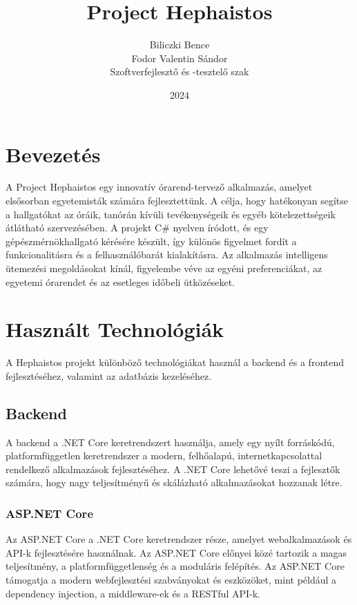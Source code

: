 \documentclass[colorlinks]{thesis-kando}
\theoremstyle{definition}
\theoremstyle{remark}
\begin{document}
\title{Project Hephaistos}
\author{Biliczki Bence\\Fodor Valentin Sándor\\Szoftverfejlesztő és -tesztelő szak}
\date{2024}
\maketitle

\tableofcontents

\pagebreak

\section*{Bevezetés}
A Project Hephaistos egy innovatív órarend-tervező alkalmazás, amelyet elsősorban egyetemisták számára fejlesztettünk. A célja, hogy hatékonyan segítse a hallgatókat az óráik, tanórán kívüli tevékenységeik és egyéb kötelezettségeik átlátható szervezésében. A projekt C\# nyelven íródott, és egy gépészmérnökhallgató kérésére készült, így különös figyelmet fordít a funkcionalitásra és a felhasználóbarát kialakításra. Az alkalmazás intelligens ütemezési megoldásokat kínál, figyelembe véve az egyéni preferenciákat, az egyetemi órarendet és az esetleges időbeli ütközéseket.

\section{Használt Technológiák}
A Hephaistos projekt különböző technológiákat használ a backend és a frontend fejlesztéséhez, valamint az adatbázis kezeléséhez.

\subsection{Backend}
A backend a .NET Core keretrendszert használja, amely egy nyílt forráskódú, platformfüggetlen keretrendszer a modern, felhőalapú, internetkapcsolattal rendelkező alkalmazások fejlesztéséhez. A .NET Core lehetővé teszi a fejlesztők számára, hogy nagy teljesítményű és skálázható alkalmazásokat hozzanak létre.

\subsubsection{ASP.NET Core}
Az ASP.NET Core a .NET Core keretrendszer része, amelyet webalkalmazások és API-k fejlesztésére használnak. Az ASP.NET Core előnyei közé tartozik a magas teljesítmény, a platformfüggetlenség és a moduláris felépítés. Az ASP.NET Core támogatja a modern webfejlesztési szabványokat és eszközöket, mint például a dependency injection, a middleware-ek és a RESTful API-k.
\end{document}
